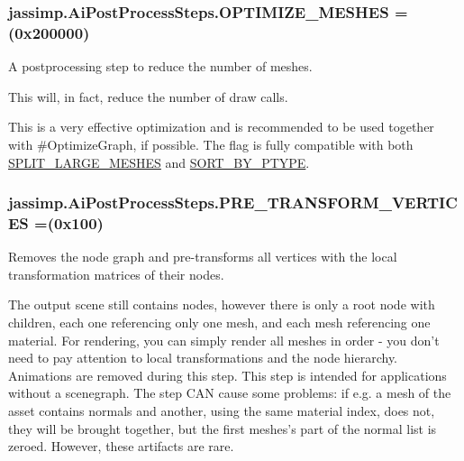 {{\subsubsection[{O\+P\+T\+I\+M\+I\+Z\+E\+\_\+\+M\+E\+S\+H\+E\+S}]{\setlength{\rightskip}{0pt plus 5cm}jassimp.\+Ai\+Post\+Process\+Steps.\+O\+P\+T\+I\+M\+I\+Z\+E\+\_\+\+M\+E\+S\+H\+E\+S =(0x200000)}}\label{enumjassimp_1_1_ai_post_process_steps_ae7fee68ad0e7ad1b5736cfbe62914b52}
A postprocessing step to reduce the number of meshes.

This will, in fact, reduce the number of draw calls.

This is a very effective optimization and is recommended to be used together with \#\+Optimize\+Graph, if possible. The flag is fully compatible with both \hyperlink{enumjassimp_1_1_ai_post_process_steps_a94fd8430f743bab4c0b844e0674a4dbf}{S\+P\+L\+I\+T\+\_\+\+L\+A\+R\+G\+E\+\_\+\+M\+E\+S\+H\+E\+S} and \hyperlink{enumjassimp_1_1_ai_post_process_steps_a90814c095595a8cb812895e1cc2d97a6}{S\+O\+R\+T\+\_\+\+B\+Y\+\_\+\+P\+T\+Y\+P\+E}. \hypertarget{enumjassimp_1_1_ai_post_process_steps_adf545ba757faa81c1c1dd687a5525d67}{
\subsubsection[{P\+R\+E\+\_\+\+T\+R\+A\+N\+S\+F\+O\+R\+M\+\_\+\+V\+E\+R\+T\+I\+C\+E\+S}]{\setlength{\rightskip}{0pt plus 5cm}jassimp.\+Ai\+Post\+Process\+Steps.\+P\+R\+E\+\_\+\+T\+R\+A\+N\+S\+F\+O\+R\+M\+\_\+\+V\+E\+R\+T\+I\+C\+E\+S =(0x100)}}\label{enumjassimp_1_1_ai_post_process_steps_adf545ba757faa81c1c1dd687a5525d67}
Removes the node graph and pre-\/transforms all vertices with the local transformation matrices of their nodes.

The output scene still contains nodes, however there is only a root node with children, each one referencing only one mesh, and each mesh referencing one material. For rendering, you can simply render all meshes in order -\/ you don't need to pay attention to local transformations and the node hierarchy. Animations are removed during this step. This step is intended for applications without a scenegraph. The step C\+A\+N cause some problems\+: if e.\+g. a mesh of the asset contains normals and another, using the same material index, does not, they will be brought together, but the first meshes's part of the normal list is zeroed. However, these artifacts are rare.

}
